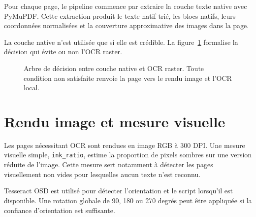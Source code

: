 \documentclass[11pt,a4paper]{article}
\begin{document}
Pour chaque page, le pipeline commence par extraire la couche texte native avec PyMuPDF. Cette extraction produit le texte natif trié, les blocs natifs, leurs coordonnées normalisées et la couverture approximative des images dans la page.

La couche native n'est utilisée que si elle est crédible. La figure~\ref{fig:decision} formalise la décision qui évite ou non l'OCR raster.

\begin{figure}[H]
\centering
{}
\caption{Arbre de décision entre couche native et OCR raster. Toute condition non satisfaite renvoie la page vers le rendu image et l'OCR local.}
\label{fig:decision}
\end{figure}

\section{Rendu image et mesure visuelle}

Les pages nécessitant OCR sont rendues en image RGB à 300 DPI. Une mesure visuelle simple, \texttt{ink\_ratio}, estime la proportion de pixels sombres sur une version réduite de l'image. Cette mesure sert notamment à détecter les pages visuellement non vides pour lesquelles aucun texte n'est reconnu.

Tesseract OSD est utilisé pour détecter l'orientation et le script lorsqu'il est disponible. Une rotation globale de 90, 180 ou 270 degrés peut être appliquée si la confiance d'orientation est suffisante.
\end{document}
